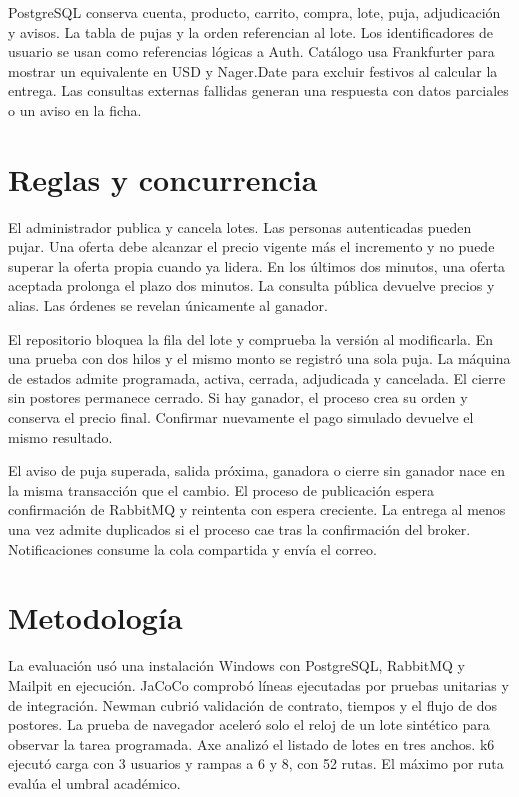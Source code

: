 \documentclass[conference]{IEEEtran}
\begin{document}
PostgreSQL conserva cuenta, producto, carrito, compra, lote, puja, adjudicación y avisos. La tabla de pujas y la orden referencian al lote. Los identificadores de usuario se usan como referencias lógicas a Auth. Catálogo usa Frankfurter para mostrar un equivalente en USD y Nager.Date para excluir festivos al calcular la entrega. Las consultas externas fallidas generan una respuesta con datos parciales o un aviso en la ficha.


\clearpage
\section{Reglas y concurrencia}
El administrador publica y cancela lotes. Las personas autenticadas pueden pujar. Una oferta debe alcanzar el precio vigente más el incremento y no puede superar la oferta propia cuando ya lidera. En los últimos dos minutos, una oferta aceptada prolonga el plazo dos minutos. La consulta pública devuelve precios y alias. Las órdenes se revelan únicamente al ganador.

El repositorio bloquea la fila del lote y comprueba la versión al modificarla. En una prueba con dos hilos y el mismo monto se registró una sola puja. La máquina de estados admite programada, activa, cerrada, adjudicada y cancelada. El cierre sin postores permanece cerrado. Si hay ganador, el proceso crea su orden y conserva el precio final. Confirmar nuevamente el pago simulado devuelve el mismo resultado.

El aviso de puja superada, salida próxima, ganadora o cierre sin ganador nace en la misma transacción que el cambio. El proceso de publicación espera confirmación de RabbitMQ y reintenta con espera creciente. La entrega al menos una vez admite duplicados si el proceso cae tras la confirmación del broker. Notificaciones consume la cola compartida y envía el correo.

\section{Metodología}
La evaluación usó una instalación Windows con PostgreSQL, RabbitMQ y Mailpit en ejecución. JaCoCo comprobó líneas ejecutadas por pruebas unitarias y de integración. Newman cubrió validación de contrato, tiempos y el flujo de dos postores. La prueba de navegador aceleró solo el reloj de un lote sintético para observar la tarea programada. Axe analizó el listado de lotes en tres anchos. k6 ejecutó carga con 3 usuarios y rampas a 6 y 8, con 52 rutas. El máximo por ruta evalúa el umbral académico.
\end{document}
